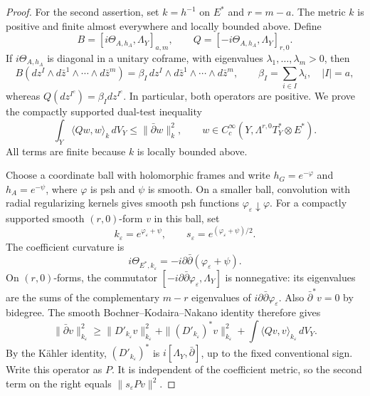 \documentclass[11pt,reqno]{amsart}
\numberwithin{equation}{section}
\theoremstyle{definition}
\theoremstyle{remark}
\begin{document}
\begin{proof}
For the second assertion, set $k=h^{-1}$ on $E^*$ and $r=m-a$.
The metric $k$ is positive and finite almost everywhere and locally
bounded above.  Define
\[
 B=[i\Theta_{A,h_A},\Lambda_Y]_{a,m},\qquad
 Q=[-i\Theta_{A,h_A},\Lambda_Y]_{r,0}.
\]
If $i\Theta_{A,h_A}$ is diagonal in a unitary coframe, with eigenvalues
$\lambda_1,\ldots,\lambda_m>0$, then
\[
 B(dz^I\wedge d\bar z^{1}\wedge\cdots\wedge d\bar z^{m})
   =\beta_I\,dz^I\wedge d\bar z^{1}\wedge\cdots\wedge d\bar z^{m},
 \qquad \beta_I=\sum_{i\in I}\lambda_i,\quad |I|=a,
\]
whereas $Q(dz^{I^c})=\beta_I dz^{I^c}$.  In particular, both
operators are positive.  We prove the compactly supported dual-test
inequality
\begin{equation}\label{eq:singular-dual-test}
 \int_Y\langle Qw,w\rangle_k\,dV_Y
 \le\|\bar\partial w\|_k^2,\qquad
 w\in C_c^\infty(Y,\Lambda^{r,0}T_Y^*\otimes E^*).
\end{equation}
All terms are finite because $k$ is locally bounded above.

Choose a coordinate ball with holomorphic frames and write
$h_G=e^{-\varphi}$ and $h_A=e^{-\psi}$, where $\varphi$ is psh and
$\psi$ is smooth.  On a smaller ball, convolution with radial
regularizing kernels gives smooth psh functions
$\varphi_\varepsilon\downarrow\varphi$.  For a compactly supported
smooth $(r,0)$-form $v$ in this ball, set
\[
 k_\varepsilon=e^{\varphi_\varepsilon+\psi},\qquad
 s_\varepsilon=e^{(\varphi_\varepsilon+\psi)/2}.
\]
The coefficient curvature is
\[
 i\Theta_{E^*,k_\varepsilon}
 =-i\partial\bar\partial(\varphi_\varepsilon+\psi).
\]
On $(r,0)$-forms, the commutator
$[-i\partial\bar\partial\varphi_\varepsilon,\Lambda_Y]$ is
nonnegative: its eigenvalues are the sums of the complementary
$m-r$ eigenvalues of $i\partial\bar\partial\varphi_\varepsilon$.
Also $\bar\partial^*v=0$ by bidegree.  The smooth
Bochner--Kodaira--Nakano identity therefore gives
\begin{equation}\label{eq:dual-local-smooth}
 \|\bar\partial v\|_{k_\varepsilon}^2
 \ge\|D'_{k_\varepsilon}v\|_{k_\varepsilon}^2
   +\|(D'_{k_\varepsilon})^*v\|_{k_\varepsilon}^2
   +\int\langle Qv,v\rangle_{k_\varepsilon}\,dV_Y.
\end{equation}
By the K\"ahler identity, $(D'_{k_\varepsilon})^*$ is
$i[\Lambda_Y,\bar\partial]$, up to the fixed conventional sign.
Write this operator as $P$.  It is independent of the coefficient
metric, so the second term on the right equals
$\|s_\varepsilon Pv\|^2$.


\end{proof}
\end{document}
